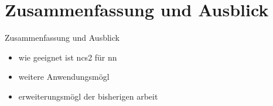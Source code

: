 \section[\thesection \  Zusammenfassung und Ausblick]{ Zusammenfassung und Ausblick}\label{sec:conclusion}

\begin{frame}{ Zusammenfassung und Ausblick}

    \begin{itemize}
        \item wie geeignet ist ncs2 für nn
        \item weitere Anwendungsmögl
        \item erweiterungsmögl der bisherigen arbeit
    \end{itemize}



\end{frame}